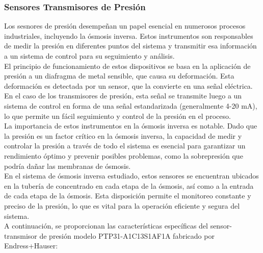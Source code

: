 \subsubsection{Sensores Transmisores de Presión}

Los sesnores de presión desempeñan un papel esencial en numerosos procesos industriales, 
incluyendo la ósmosis inversa. Estos instrumentos son responsables de medir la presión en diferentes puntos 
del sistema y transmitir esa información a un sistema de control para su seguimiento y análisis.\\

El principio de funcionamiento de estos dispositivos se basa en la aplicación de presión a un diafragma de 
metal sensible, que causa su deformación. Esta deformación es detectada por un sensor, que la convierte en 
una señal eléctrica. En el caso de los transmisores de presión, esta señal se transmite luego a un sistema de control en forma de una señal estandarizada (generalmente 4-20 mA), lo que permite un fácil seguimiento y control de la presión en el proceso.\\

La importancia de estos instrumentos en la ósmosis inversa es notable. Dado que la presión es un factor 
crítico en la ósmosis inversa, la capacidad de medir y controlar la presión a través de todo el sistema 
es esencial para garantizar un rendimiento óptimo y prevenir posibles problemas, como la sobrepresión 
que podría dañar las membranas de ósmosis.\\

En el sistema de ósmosis inversa estudiado, estos sensores se encuentran 
ubicados en la tubería de concentrado en cada etapa de la ósmosis, así como a la entrada de cada etapa
de la ósmosis. Esta disposición permite el monitoreo constante y preciso de la presión, lo que es 
vital para la operación eficiente y segura del sistema.\\

A continuación, se proporcionan las características específicas del sensor-transmisor de presión
modelo PTP31-A1C13S1AF1A fabricado por Endress+Hauser:\\



